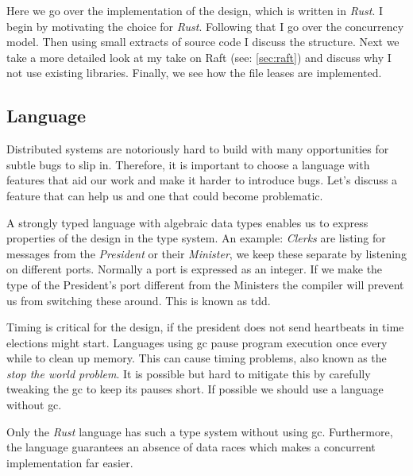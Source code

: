 Here we go over the implementation of the design, which is written in \textit{Rust}. I begin by motivating the choice for \textit{Rust}. Following that I go over the concurrency model. Then using small extracts of source code I discuss the structure. Next we take a more detailed look at my take on Raft (see: \cref{sec:raft}) and discuss why I not use existing libraries. Finally, we see how the file leases are implemented.

\subsection{Language}
Distributed systems are notoriously hard to build with many opportunities for subtle bugs to slip in. Therefore, it is important to choose a language with features that aid our work and make it harder to introduce bugs. Let's discuss a feature that can help us and one that could become problematic.

A strongly typed language with algebraic data types enables us to express properties of the design in the type system. An example: \textit{Clerks} are listing for messages from the \textit{President} or their \textit{Minister}, we keep these separate by listening on different ports. Normally a port is expressed as an integer. If we make the type of the President's port different from the Ministers the compiler will prevent us from switching these around. This is known as \ac{tdd}.

Timing is critical for the design, if the president does not send heartbeats in time elections might start. Languages using \ac{gc} pause program execution once every while to clean up memory. This can cause timing problems, also known as the \textit{stop the world problem}. It is possible but hard to mitigate this by carefully tweaking the \ac{gc} to keep its pauses short. If possible we should use a language without \ac{gc}.

Only the \textit{Rust} language has such a type system without using \ac{gc}. Furthermore, the language guarantees an absence of data races which makes a concurrent implementation far easier.

